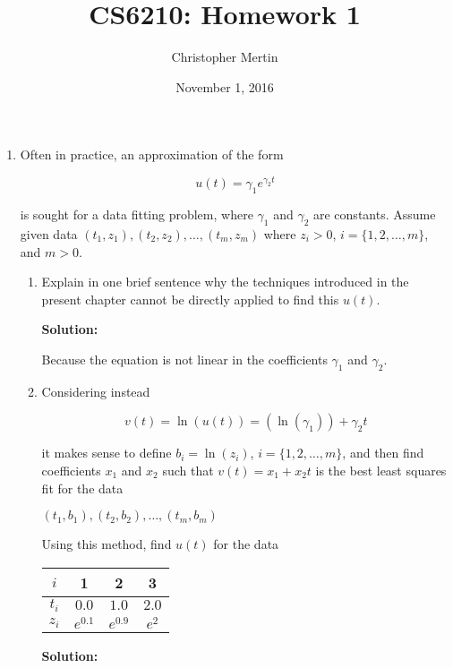 \documentclass[12pt]{article}
\begin{document}
\title{CS6210: Homework 1}
\author{Christopher Mertin}
\date{November 1, 2016}
\maketitle

\begin{enumerate}
\item Often in practice, an approximation of the form

\[
u(t) = \gamma_{1}e^{\gamma_{2}t}
\]

is sought for a data fitting problem, where $\gamma_{1}$ and $\gamma_{2}$ are
constants. Assume given data $\left(t_{1}, z_{1}\right),\left(t_{2}, z_{2}\right),\ldots,\left(t_{m}, z_{m}\right)$
where $z_{i} > 0$, $i = \{ 1,2,\ldots,m\}$, and $m > 0$.

\begin{enumerate}
\item Explain in one brief sentence why the techniques introduced in the present
chapter cannot be directly applied to find this $u(t)$.

{\bf Solution:}

Because the equation is not linear in the coefficients $\gamma_{1}$ and $\gamma_{2}$.

\item Considering instead

\[
v(t) = \ln\left( u(t)\right) = \left(\ln\left( \gamma_{1}\right)\right) + \gamma_{2}t
\]

it makes sense to define $b_{i} = \ln\left( z_{i}\right)$, $i = \{ 1,2,\ldots,m\}$,
and then find coefficients $x_{1}$ and $x_{2}$ such that $v(t) = x_{1} + x_{2}t$
is the best least squares fit for the data

$\left(t_{1}, b_{1}\right),\left(t_{2}, b_{2}\right),\ldots,\left(t_{m}, b_{m}\right)$

Using this method, find $u(t)$ for the data

\begin{table}[H]
  \centering
\begin{tabular}{| c | c | c | c |}
  \hline
$i$ & 1 & 2 & 3\\
\hline
$t_{i}$ & $0.0$ & $1.0$ & $2.0$\\
\hline
$z_{i}$ & $e^{0.1}$ & $e^{0.9}$ & $e^{2}$\\
\hline
\end{tabular}
\end{table}

{\bf Solution:}


\end{enumerate}
\end{enumerate}
\end{document}

